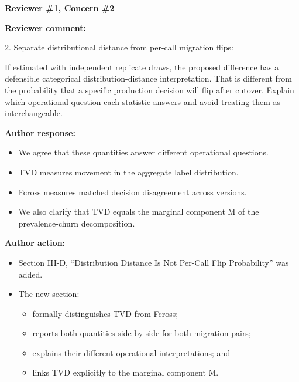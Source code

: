 \documentclass[11pt]{article}
\newcommand{\rvcomment}[1]{{\color{ReviewerGreen}#1}}
\newcommand{\concern}[1]{\textbf{\color{ReviewerGreen}#1}}
\begin{document}
\vspace{12pt}
\concern{Reviewer \#1, Concern \#2}

\concern{Reviewer comment:}

\rvcomment{2. Separate distributional distance from per-call migration flips:}

\rvcomment{If estimated with independent replicate draws, the proposed difference has a defensible categorical distribution-distance interpretation. That is different from the probability that a specific production decision will flip after cutover. Explain which operational question each statistic answers and avoid treating them as interchangeable.}

\textbf{Author response:}

\begin{itemize}

\item We agree that these quantities answer different operational questions.

\item TVD measures movement in the aggregate label distribution.

\item Fcross measures matched decision disagreement across versions.

\item We also clarify that TVD equals the marginal component M of the prevalence-churn decomposition.

\end{itemize}

\textbf{Author action:}

\begin{itemize}

\item Section III-D, ``Distribution Distance Is Not Per-Call Flip Probability'' was added.

\item The new section:

\begin{itemize}

\item formally distinguishes TVD from Fcross;

\item reports both quantities side by side for both migration pairs;

\item explains their different operational interpretations; and

\item links TVD explicitly to the marginal component M.

\end{itemize}

\end{itemize}
\end{document}
